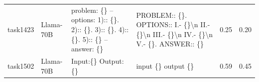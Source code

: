 \begin{longtable}{@{}p{0.8cm\tiny}p{1cm\tiny}p{4.1cm\ttfamily\tiny}p{4.1cm\ttfamily\tiny}p{0.8cm\tiny}p{0.8cm\tiny}@{}}
task1423  & Llama-70B  & problem: \{\} -- options:   1):: \{\}. 2):: \{\}. 3):: \{\}. 4):: \{\}. 5):: \{\} -- answer: \{\}                                                                                                                                                                                                                                                                                                                                                                                                                       & PROBLEM:: \{\}. OPTIONS::   I.- \{\}\textbackslash{}n II.- \{\}\textbackslash{}n III.- \{\}\textbackslash{}n IV.- \{\}\textbackslash{}n V.- \{\}. ANSWER:: \{\}                                                                                                                                                                                                                                                                                                                                                                                                                   & 0.25 & 0.20 \\
task1502  & Llama-70B  & Input:\{\}  Output:\{\}                                                                                                                                                                                                                                                                                                                                                                                                                                                                                                 & input \{\} output \{\}                                                                                                                                                                                                                                                                                                                                                                                                                                                                                                                                                            & 0.59 & 0.45 \\

\end{longtable}
